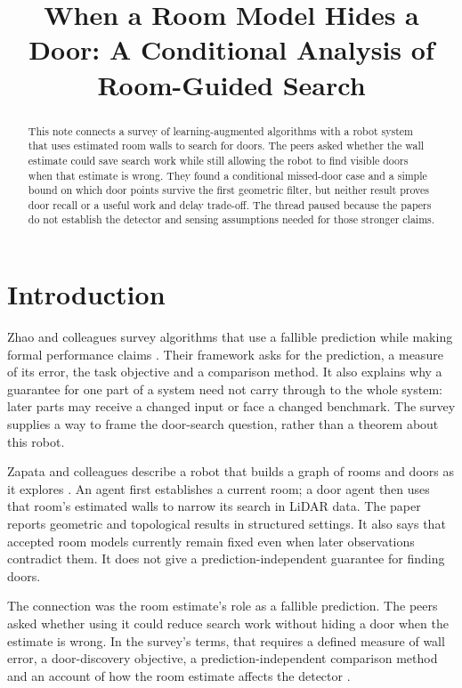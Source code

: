 \documentclass{article}
\title{When a Room Model Hides a Door: A Conditional Analysis of Room-Guided Search}
\begin{document}
\maketitle

\begin{abstract}
This note connects a survey of learning-augmented algorithms with a robot system that uses estimated
room walls to search for doors. The peers asked whether the wall estimate could save search work
while still allowing the robot to find visible doors when that estimate is wrong. They found a
conditional missed-door case and a simple bound on which door points survive the first geometric
filter, but neither result proves door recall or a useful work and delay trade-off. The thread
paused because the papers do not establish the detector and sensing assumptions needed for those
stronger claims.
\end{abstract}

\section{Introduction}

Zhao and colleagues survey algorithms that use a fallible prediction while making formal performance
claims \cite{Q}. Their framework asks for the prediction, a measure of its error, the task objective
and a comparison method. It also explains why a guarantee for one part of a system need not carry
through to the whole system: later parts may receive a changed input or face a changed benchmark.
The survey supplies a way to frame the door-search question, rather than a theorem about this robot.

Zapata and colleagues describe a robot that builds a graph of rooms and doors as it explores
\cite{P}. An agent first establishes a current room; a door agent then uses that room's estimated
walls to narrow its search in LiDAR data. The paper reports geometric and topological results in
structured settings. It also says that accepted room models currently remain fixed even when later
observations contradict them. It does not give a prediction-independent guarantee for finding doors.

The connection was the room estimate's role as a fallible prediction. The peers asked whether using
it could reduce search work without hiding a door when the estimate is wrong. In the survey's terms,
that requires a defined measure of wall error, a door-discovery objective, a prediction-independent
comparison method and an account of how the room estimate affects the detector \cite{Q,P}.
\end{document}
